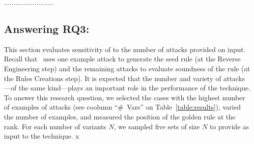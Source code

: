 \documentclass[sigconf,review, anonymous]{acmart}
\begin{document}
\begin{center}
\begin{tcolorbox}[enhanced,width=3.3in,center upper,drop shadow southwest,sharp corners]
..........................
\end{tcolorbox}
\end{center}

\subsection{Answering RQ3: \textRQthree}
\label{sec:answer-rqthree}

This section evaluates sensitivity of \tname{} to the number of
attacks provided on input. Recall that \tname\ uses one example attack
to generate the seed rule (at the Reverse Engineering step) and the
remaining attacks to evaluate soundness of the rule (at the Rules
Creations step). It is expected that the number and variety of
attacks---of the same kind---plays an important role in the
performance of the technique. To answer this research question, we
selected the cases with the highest number of examples of attacks (see
coolumn ``\#~Vars'' on Table~\ref{table:results}), varied the number of
examples, and measured the position of the golden rule at the
rank. For each number of variants $N$, we sampled five sets of size
$N$ to provide as input to the technique.
x


\end{document}
